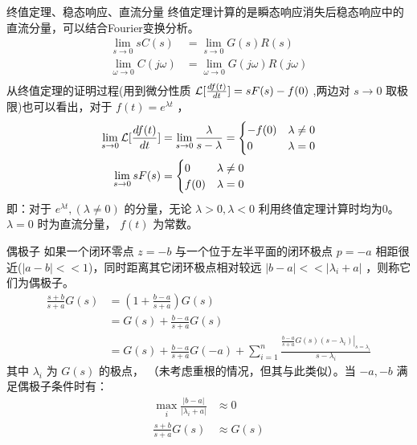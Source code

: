 \documentclass[presentation]{beamer}
\begin{document}
\begin{frame}[label={sec:org528eeaa}]{终值定理、稳态响应、直流分量}
终值定理计算的是瞬态响应消失后稳态响应中的直流分量，可以结合Fourier变换分析。
\begin{align*}
\lim_{s\to 0}sC(s) &= \lim_{s\to 0}G(s)R(s) \\
\lim_{\omega\to 0}C(j\omega) &= \lim_{\omega\to 0}G(j\omega)R(j\omega)\\
\end{align*}
从终值定理的证明过程(用到微分性质 \({\cal L}[\frac{df(t)}{dt}]=sF(s)-f(0)\) ,两边对 \(s\to 0\) 取极限)也可以看出，对于 \(f(t)=e^{\lambda t}\) ，
\begin{align*}
\lim_{s\to 0}{\cal L} [\frac{df(t)}{dt}]&=\lim_{s\to 0}\frac{\lambda}{s-\lambda}=
\begin{cases}
-f(0)  & \lambda\neq 0\\
0   & \lambda=0
\end{cases}\\
\lim_{s\to 0} sF(s) &=
\begin{cases}
0  & \lambda\neq 0\\
f(0)   & \lambda=0
\end{cases}
\end{align*}
即：对于 \(e^{\lambda t},(\lambda\neq0)\) 的分量，无论 \(\lambda>0,\lambda<0\) 利用终值定理计算时均为0。\(\lambda=0\) 时为直流分量， \(f(t)\) 为常数。
\end{frame}
\begin{frame}[label={sec:orgca95731}]{偶极子}
如果一个闭环零点 \(z=-b\) 与一个位于左半平面的闭环极点 \(p=-a\) 相距很近(\(|a-b|<<1\))，同时距离其它闭环极点相对较远 \(|b-a|<<|\lambda_i+a|\) ，则称它们为偶极子。
\begin{align*}
\frac{s+b}{s+a}G(s) & = (1+\frac{b-a}{s+a})G(s)\\
&=G(s)+\frac{b-a}{s+a}G(s)\\
&=G(s)+\frac{b-a}{s+a}G(-a)+\sum_{i=1}^n \frac{\left.\frac{b-a}{s+a}G(s)(s-\lambda_i)\right|_{s=\lambda_i}}{s-\lambda_i}
\end{align*}
其中 \(\lambda_i\) 为 \(G(s)\) 的极点， （未考虑重根的情况，但其与此类似）。当 \(-a,-b\) 满足偶极子条件时有：
\begin{align*}
\max_{i}\frac{|b-a|}{|\lambda_i+a|} &\approx 0\\
\frac{s+b}{s+a}G(s) & \approx G(s) \\
\end{align*}
\end{frame}
\end{document}

